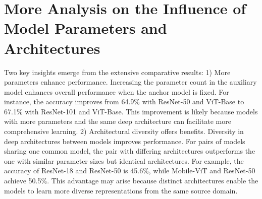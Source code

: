 



\section{More Analysis on the Influence of Model Parameters and Architectures}
\label{MoreAcross}

Two key insights emerge from the extensive comparative results: 1) More parameters enhance performance. Increasing the parameter count in the auxiliary model enhances overall performance when the anchor model is fixed. For instance, the accuracy improves from 64.9\% with ResNet-50 and ViT-Base to 67.1\% with ResNet-101 and ViT-Base. This improvement is likely because models with more parameters and the same deep architecture can facilitate more comprehensive learning. 2) Architectural diversity offers benefits. Diversity in deep architectures between models improves performance. For pairs of models sharing one common model, the pair with differing architectures outperforms the one with similar parameter sizes but identical architectures. For example, the accuracy of ResNet-18 and ResNet-50 is 45.6\%, while Mobile-ViT and ResNet-50 achieve 50.5\%. This advantage may arise because distinct architectures enable the models to learn more diverse representations from the same source domain.






